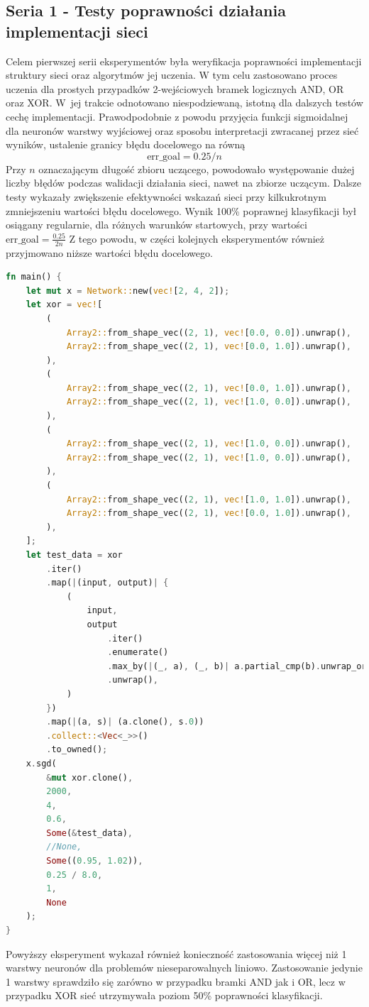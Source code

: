 \documentclass[12pt,twoside]{article}
\begin{document}
\subsection{Seria 1 - Testy poprawności działania implementacji sieci}
Celem pierwszej serii eksperymentów była weryfikacja poprawności implementacji struktury sieci oraz algorytmów jej uczenia.
W tym celu zastosowano proces uczenia dla prostych przypadków 2-wejściowych bramek logicznych AND, OR oraz XOR.
W~jej trakcie odnotowano niespodziewaną, istotną dla dalszych testów cechę implementacji.
Prawodpodobnie z powodu przyjęcia funkcji sigmoidalnej dla neuronów warstwy wyjściowej oraz sposobu interpretacji zwracanej przez sieć wyników, ustalenie granicy błędu docelowego na równą
\begin{equation*}
    \text{err\_goal} = 0.25 / n
\end{equation*}
Przy $n$ oznaczającym długość zbioru uczącego, powodowało występowanie dużej liczby błędów podczas walidacji działania sieci, nawet na zbiorze uczącym.
Dalsze testy wykazały zwiększenie efektywności wskazań sieci przy kilkukrotnym zmniejszeniu wartości błędu docelowego.
Wynik 100\% poprawnej klasyfikacji był osiągany regularnie, dla różnych warunków startowych, przy wartości $\text{err\_goal} = \frac{0.25}{2n}$
Z tego powodu, w części kolejnych eksperymentów również przyjmowano niższe wartości błędu docelowego.


\begin{lstlisting}[language=Rust,caption=Skrypt uczący dla bramki logicznej XOR,label={lst:example_xor}]
	fn main() {
    let mut x = Network::new(vec![2, 4, 2]);
    let xor = vec![
        (
            Array2::from_shape_vec((2, 1), vec![0.0, 0.0]).unwrap(),
            Array2::from_shape_vec((2, 1), vec![0.0, 1.0]).unwrap(),
        ),
        (
            Array2::from_shape_vec((2, 1), vec![0.0, 1.0]).unwrap(),
            Array2::from_shape_vec((2, 1), vec![1.0, 0.0]).unwrap(),
        ),
        (
            Array2::from_shape_vec((2, 1), vec![1.0, 0.0]).unwrap(),
            Array2::from_shape_vec((2, 1), vec![1.0, 0.0]).unwrap(),
        ),
        (
            Array2::from_shape_vec((2, 1), vec![1.0, 1.0]).unwrap(),
            Array2::from_shape_vec((2, 1), vec![0.0, 1.0]).unwrap(),
        ),
    ];
    let test_data = xor
        .iter()
        .map(|(input, output)| {
            (
                input,
                output
                    .iter()
                    .enumerate()
                    .max_by(|(_, a), (_, b)| a.partial_cmp(b).unwrap_or(std::cmp::Ordering::Equal))
                    .unwrap(),
            )
        })
        .map(|(a, s)| (a.clone(), s.0))
        .collect::<Vec<_>>()
        .to_owned();
    x.sgd(
        &mut xor.clone(),
        2000,
        4,
        0.6,
        Some(&test_data),
        //None,
        Some((0.95, 1.02)),
        0.25 / 8.0,
        1,
        None
    );
}
\end{lstlisting}
Powyższy eksperyment wykazał również konieczność zastosowania więcej niż 1 warstwy neuronów dla problemów nieseparowalnych liniowo.
Zastosowanie jedynie 1 warstwy sprawdziło się zarówno w przypadku bramki AND jak i OR, lecz w przypadku XOR sieć utrzymywała poziom 50\% poprawności klasyfikacji.
\end{document}
